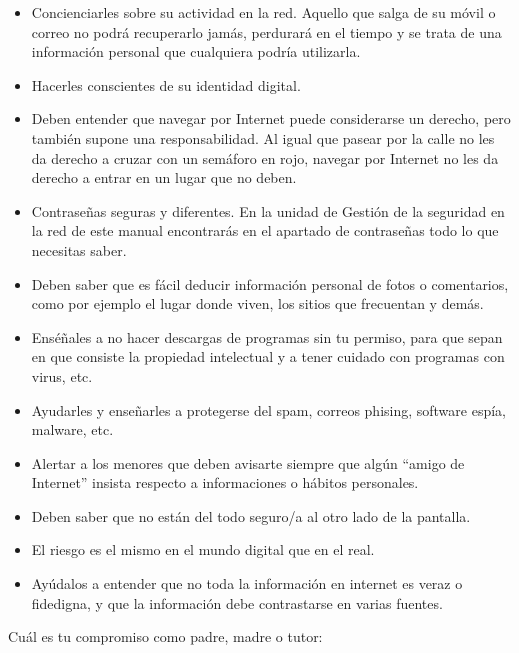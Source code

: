 \documentclass[
  a4paper,
  openany]{book}
\begin{document}
\begin{itemize}
\item
  Concienciarles sobre su actividad en la red. Aquello que salga de su móvil o correo no podrá recuperarlo jamás, perdurará en el tiempo y se trata de una información personal que cualquiera podría utilizarla.
\item
  Hacerles conscientes de su identidad digital.
\item
  Deben entender que navegar por Internet puede considerarse un derecho, pero también supone una responsabilidad. Al igual que pasear por la calle no les da derecho a cruzar con un semáforo en rojo, navegar por Internet no les da derecho a entrar en un lugar que no deben.
\item
  Contraseñas seguras y diferentes. En la unidad de Gestión de la seguridad en la red de este manual encontrarás en el apartado de contraseñas todo lo que necesitas saber.
\item
  Deben saber que es fácil deducir información personal de fotos o comentarios, como por ejemplo el lugar donde viven, los sitios que frecuentan y demás.
\item
  Enséñales a no hacer descargas de programas sin tu permiso, para que sepan en que consiste la propiedad intelectual y a tener cuidado con programas con virus, etc.
\item
  Ayudarles y enseñarles a protegerse del spam, correos phising, software espía, malware, etc.
\item
  Alertar a los menores que deben avisarte siempre que algún ``amigo de Internet'' insista respecto a informaciones o hábitos personales.
\item
  Deben saber que no están del todo seguro/a al otro lado de la pantalla.
\item
  El riesgo es el mismo en el mundo digital que en el real.
\item
  Ayúdalos a entender que no toda la información en internet es veraz o fidedigna, y que la información debe contrastarse en varias fuentes.
\end{itemize}

Cuál es tu compromiso como padre, madre o tutor:
\end{document}
